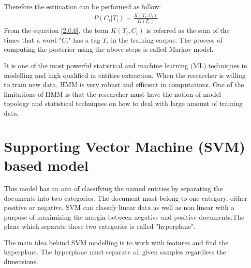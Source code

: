 Therefore the estimation can be performed as follow:
\begin{align}
P(C_{i}|T_{i}) =  \frac{K(T_{i},C_{i})}{K(T_{i})} \label{2.0.6}
\end{align}
From the equation \eqref{2.0.6}, the term $K(T_{i},C_{i})$  is referred as the sum of the times that a word "$C_{i}$" has a tag $T_{i}$ in the training corpus.
The process of computing the posterior using the above steps is called Markov model.

It is one of the most powerful statistical and machine learning (ML) techniques in modelling and high qualified in entities extraction. When the researcher is willing to train new data, HMM is very robust and efficient in computations.
One of the limitations of HMM is that the researcher must have the notion of model topology and statistical techniques on how to deal with large amount of training data.
\section{Supporting Vector Machine (SVM) based model}
This model has an aim of classifying the named entities by separating the documents into two categories.  The document must belong to one category, either positive or negative.  SVM can classify linear data as well as non linear with a purpose of maximizing the margin between negative and positive documents.The plane which separate those two categories is called "hyperplane".

The main idea behind SVM modelling is to work with features and find the hyperplane. The hyperplane must separate all given samples regardless the dimensions.

